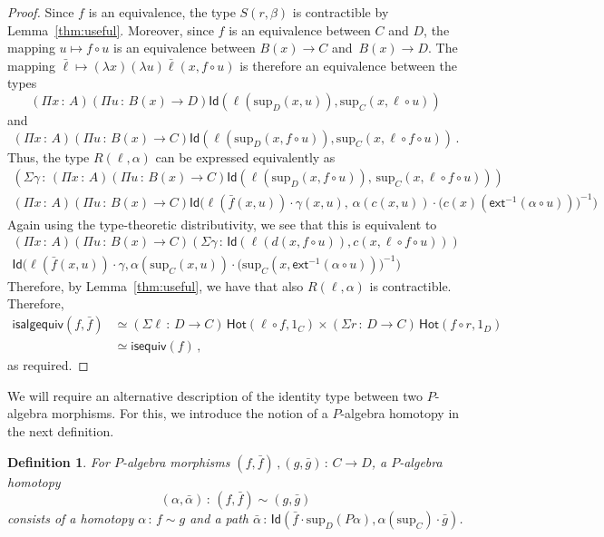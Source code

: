\documentclass[10pt,a4paper,oneside,reqno]{amsart}
\numberwithin{equation}{section}
\theoremstyle{mythm}
\theoremstyle{mydef}
\newtheorem{definition}[theorem]{Definition}
\theoremstyle{myrmk}
\newcommand{\co}{\,{:}\,}
\newcommand{\com}{\circ}
\newcommand{\ct}{\cdot}
\newcommand{\isequiv}{\mathsf{isequiv}}
\newcommand{\Hot}{\mathsf{Hot}}
\newcommand{\ext}{\mathsf{ext}}
\newcommand{\Id}{\mathsf{Id}}
\renewcommand{\sup}{\mathrm{sup}}
\newcommand{\isalgequiv}{\mathsf{isalgequiv}}
\begin{document}
\begin{proof}
Since $f$ is an equivalence,  the type $S(r,\beta)$ is contractible by Lemma~\ref{thm:useful}.
Moreover, since $f$ is an equivalence between $C$ and $D$, the mapping $u  \mapsto f \com u$ is an equivalence between $B(x) \to C$ and~$B(x) \to D$. The mapping 
$\bar{\ell} \mapsto (\lambda x) (\lambda u) \bar{\ell}(x,f \com u)$ is therefore an equivalence between the types 
\[
(\Pi x \co A) 
(\Pi u \co B(x) \to  D) 
\Id(\ell(\sup_D(x,u)), \sup_C(x,\ell \com u))
\] and
\[
(\Pi x \co A) 
(\Pi u \co B(x) \to C)
 \Id(\ell(\sup_D(x,f \com u)), \sup_C(x,\ell \com f \com u) )\, .
 \] 
Thus, the type $R(\ell,\alpha)$ can be expressed equivalently as
\begin{multline*}
(\Sigma \gamma \co 
(\Pi x \co A)
(\Pi u \co B(x) \to C) 
\Id(\ell(\sup_D(x,f \circ u)),\, \sup_C(x,\ell \circ f \circ u))) \\ 
(\Pi x \co A) 
(\Pi u \co B(x) \to C) 
	\Id\big(\ell(\bar{f}(x,u)) \ct \gamma(x,u),\, \alpha(c(x,u)) \ct \big(c(x)(\ext^{-1}(\alpha \circ u))\big)^{-1}\big)
\end{multline*}
Again using the type-theoretic distributivity, we see that this is equivalent to
\begin{multline*}
(\Pi x \co A)
(\Pi u \co B(x) \to C)
(\Sigma \gamma \co \Id(\ell(d(x,f \circ u)), c(x,\ell \circ f \circ u))) \\
  \Id \big(\ell(\bar{f}(x,u)) \ct \gamma , \alpha(\sup_C(x,u)) \ct \big(\sup_C(x, \ext^{-1}(\alpha \circ u))\big)^{-1}\big)
  \end{multline*} 
Therefore, by Lemma~\ref{thm:useful}, we have that also $R(\ell,\alpha)$ is contractible.  Therefore,
\begin{align*} 
\isalgequiv(f,\bar{f}) 
 & \simeq (\Sigma \ell \co D \to C) \, \Hot( \ell \com f,1_C )\times 
		(\Sigma r  \co D \to C) \, \Hot( f \com r, 1_D)  \\
 & \simeq  \isequiv(f) \, ,
\end{align*} 
as required.
\end{proof}







We will require an alternative description of the identity type between two $P$-algebra morphisms. For this, we introduce 
the notion of a $P$-algebra homotopy in the next definition.


\begin{definition}
For $P$-algebra morphisms $(f, \bar{f}) \, , (g, \bar{g}) \co C \to D$, a \emph{$P$-algebra homotopy}  
\[
(\alpha, \bar{\alpha}) \co (f, \bar{f}) \sim (g, \bar{g})
\] 
consists of a homotopy $\alpha \co f \sim g$ and a path
$\bar{\alpha} \co \Id( \bar{f} \cdot \sup_D (P \alpha) ,  \alpha(\sup_C)\cdot \bar{g})$. 
\end{definition}
\end{document}
